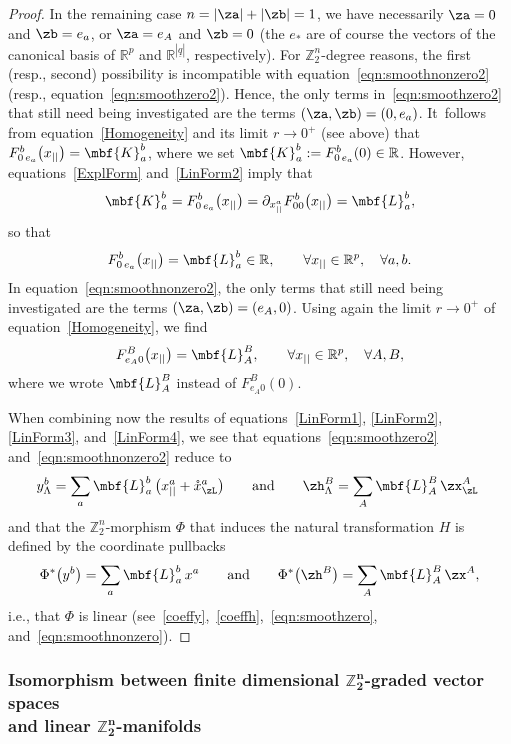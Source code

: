 \documentclass[10pt,a4paper]{amsart}
\newcommand{\R}{{\mathbb R}}
\newcommand{\Z}{{\mathbb Z}}
\def\ul{\underline}
\def\ul{\underline}
\newcommand{\0}{\otimes}
\newcommand{\z}{\Z_2^n}
\numberwithin{equation}{section}
\begin{document}
\begin{proof}
In the remaining case $n=|\za|+|\zb|=1$, we have necessarily $\za=0$ and $\zb=e_a$, or $\za=e_A$ and $\zb=0$ (the $e_*$ are of course the vectors of the canonical basis of $\R^p$ and $\R^{|\ul q|}$, respectively). For $\z$-degree reasons, the first (resp., second) possibility is incompatible with equation~\eqref{eqn:smoothnonzero2} (resp., equation~\eqref{eqn:smoothzero2}). Hence, the only terms in~\eqref{eqn:smoothzero2} that still need being investigated are the terms $(\za,\zb)=(0,e_a)$. It~follows from equation~\eqref{Homogeneity} and its limit $r\to 0^+$ (see above) that $F_{0\,e_a}^b\big(x_{||}\big)=\mbf{K}^b_a$, where we set $\mbf{K}^b_a:=F^b_{0\,e_a}(0)\in\R$. However, equations~\eqref{ExplForm} and~\eqref{LinForm2} imply that
\[
\mbf{K}^b_a=F^b_{0\,e_a}\big(x_{||}\big)=\partial_{x_{||}^a}F^b_{00}\big(x_{||}\big)=\mbf{L}^b_a,
\]
so that
\begin{gather}\label{LinForm3}
F_{0\,e_a}^b\big(x_{||}\big)=\mbf{L}^b_a\in\R,\qquad
\forall x_{||}\in\R^p, \quad \forall a,b.
\end{gather}
In equation~\eqref{eqn:smoothnonzero2}, the only terms that still need being investigated are the terms $(\za,\zb)=(e_A,0)$. Using again the limit $r\to 0^+$ of equation~\eqref{Homogeneity}, we find
\begin{gather}\label{LinForm4}
F^B_{e_A 0}\big(x_{||}\big)=\mbf{L}^B_A,\qquad\forall x_{||}\in\R^p,\quad\forall A,B,
\end{gather}
where we wrote $\mbf{L}^B_A$ instead of $F^B_{e_A 0}(0)$.

When combining now the results of equations~\eqref{LinForm1}, \eqref{LinForm2}, \eqref{LinForm3}, and~\eqref{LinForm4}, we see that equations~\eqref{eqn:smoothzero2} and~\eqref{eqn:smoothnonzero2} reduce to \begin{gather*}
y^b_\Lambda = \sum_a\mbf{L}^b_a\, \big(x_{||}^a+\mathring{x}_{\zL}^a\big)\qquad\text{and}\qquad
\zh^B_\Lambda =\sum_A\mbf{L}^B_A \, \zx_\zL^A\;
\end{gather*}
and that the $\z$-morphism $\Phi$ that induces the natural transformation $H$ is defined by the coordinate pullbacks
\[
\Phi^*\big(y^b\big)= \sum_a\mbf{L}^b_a\, x^a\qquad\text{and}\qquad \Phi^*\big(\zh^B\big)=\sum_A\mbf{L}^B_A \, \zx^A,
\]
 i.e., that $\Phi$ is linear (see~\eqref{coeffy},~\eqref{coeffh},~\eqref{eqn:smoothzero}, and~\eqref{eqn:smoothnonzero}).\end{proof}

\subsubsection[Isomorphism between finite dimensional Z2n-graded vector spaces and linear Z2n-manifolds]
{Isomorphism between finite dimensional $\boldsymbol{\Z_2^n}$-graded vector spaces\\ and linear $\boldsymbol{\Z_2^n}$-manifolds}
\end{document}
